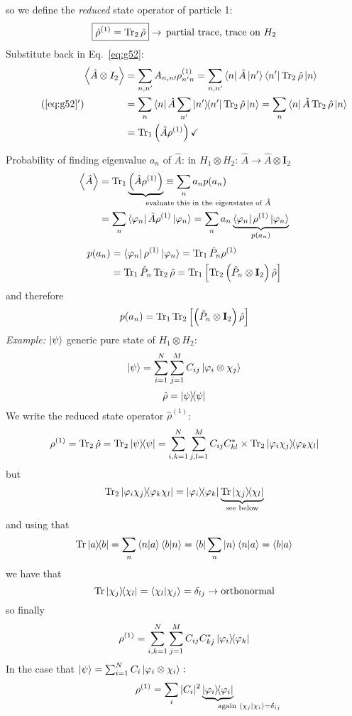 \documentclass[12pt]{article}
\newcommand{\be}{\begin{equation}}
\newcommand{\ee}{\end{equation}}
\begin{document}
so we define the \emph{reduced} state operator of particle 1:
\be
\boxed{
\hat{\rho}^{(1)} = \Tr_2 \hat{\rho}
}\to\,\text{partial trace, trace on }H_2
\ee
Substitute back in Eq.~\ref{eq:g52}:
\[
\tag{\ref{eq:g52}$^\prime$}
\begin{aligned}
\left\langle\hat{A} \otimes I_{2}\right\rangle 
&= \sum_{n,n^\prime} A_{n,n\prime} \rho_{n^{\prime}n}^{(1)}
 = \sum_{n,n^\prime} \bra{n}\hat{A}\ket{n^\prime}\bra{n^\prime}\Tr_2\hat{\rho}\ket{n}\\
&= \sum_n \bra{n}\hat{A} \sum_{n^\prime}\op{n^\prime}{n^\prime}\Tr_2\hat{\rho}\ket{n}
 = \sum_n \bra{n}\hat{A}\Tr_2\hat{\rho}\ket{n}\\
&= \Tr_1\left(\hat{A}\rho^{(1)}\right)\checkmark
\end{aligned}
\]

Probability of finding eigenvalue $a_n$ of $\hat{A}$: in $H_1 \otimes H_2$: $\hat{A} \to \hat{A} \otimes \mathbf{I}_2$
\[
\begin{aligned}
\ev{\hat{A}} 
&= \Tr_1
\underbrace{\left(\hat{A}\rho^{(1)}\right)}%
_{\mathrlap{\text{evaluate this in the eigenstates of }\hat{A}}}
\equiv \sum_n a_n p(a_n)\\
&=\sum_n \bra{\varphi_n}\hat{A}\rho^{(1)}\ket{\varphi_n} 
=\sum_n a_n \underbrace{\bra{\varphi_n}\rho^{(1)}\ket{\varphi_n}}%
_{p(a_n)}
\end{aligned}
\]
%
\[
\begin{aligned}
p(a_n) 
&= \bra{\varphi_n}\rho^{(1)}\ket{\varphi_n}
= \Tr_1 \hat{P}_n \rho^{(1)}\\
&= \Tr_1 \hat{P}_n \Tr_2 \hat{\rho}
= \Tr_1 \left[\Tr_2\left(\hat{P}_n \otimes\mathbf{I}_2\right)\hat{\rho}\right]
\end{aligned}
\]
and therefore
\be
p(a_n) = \Tr_1\Tr_2 \left[\left(\hat{P}_n \otimes \mathbf{I}_2\right)\hat{\rho}\right]
\ee
\emph{Example:} $\ket{\psi}$ generic pure state of $H_1 \otimes H_2$:
\be
\ket{\psi} = \sum_{i=1}^{N} \sum_{j=1}^{M} C_{ij} \ket{\varphi_i \otimes \chi_j}
\ee
\be
\hat{\rho} = \op{\psi}{\psi}
\ee
We write the reduced state operator $\hat{\rho}^(1)$:
\[
\rho^{(1)} = \Tr_2 \hat{\rho} =  \Tr_2 \op{\psi}{\psi} = \sum_{i,k=1}^{N} \sum_{j,l=1}^{M} C_{ij} C_{kl}^*
\times \Tr_2 \op{\varphi_i \chi_j}{\varphi_k \chi_l}
\]
but
\[
\Tr_2 \op{\varphi_i \chi_j}{\varphi_k \chi_l} = 
\op{\varphi_i}{\varphi_k} 
\underbrace{\Tr\op{\chi_j}{\chi_l}}%
_{\text{see below}}
\]
and using that
\[
\Tr\op{a}{b} = \sum_n\bra{n}\ket{a}\bra{b}\ket{n}
=\bra{b}\sum_n\ket{n}\bra{n}\ket{a}
=\bra{b}\ket{a}
\]
we have that
\[
\Tr\op{\chi_j}{\chi_l} = \bra{\chi_l}\ket{\chi_j} = \delta_{lj}\to\text{orthonormal} 
\]
so finally
\be
\rho^{(1)} = \sum_{i,k=1}^{N} \sum_{j=1}^{M} C_{ij} C_{kj}^* \op{\varphi_i}{\varphi_k} 
\ee
In the case that
\(
\ket{\psi} = \sum_{i=1}^{N} C_{i} \ket{\varphi_i \otimes \chi_i}:
\)
\be
\rho^{(1)} = \sum_{i} |C_{i}|^2 
\underbrace{\op{\varphi_i}{\varphi_i}}%
_{\mathrlap{\text{again } \bra{\chi_j}\ket{\chi_i} = \delta_{ij}}}
\ee
\end{document}
